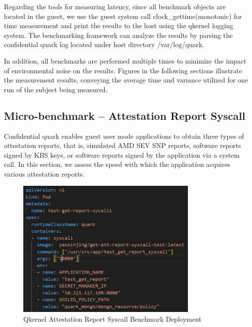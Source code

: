 Regarding the tools for measuring latency, since all benchmark objects are located in the guest, we use the guest system call clock\_gettime(monotonic) \cite*{clock_gettime} for time measurement and print the results to the host using the qkernel logging system. The benchmarking framework \cite*{benchamark_framework} can analyze the 
results by parsing the confidential quark log located under host directory /var/log/quark.

In addition, all benchmarks are performed multiple times to minimize the impact of environmental noise on the results. Figures in the following sections illustrate the measurement results, conveying the average time and variance utilized for one run of the subject being measured.

\subsection{Micro-benchmark – Attestation Report Syscall}\label{Attestation_Report_Syscall}

Confidential quark enables guest user mode applications to obtain three types of attestation reports, that is, simulated AMD SEV SNP reports, software reports signed by KBS keys, or software reports signed by the application via a system call. In this section, we assess 
the speed with which the application acquires various attestation reports.

\begin{figure}[H]
    \centering
    \includegraphics[width=0.8\textwidth]{images/perf_attestation_report_yaml.PNG}
    \caption[Qkernel Attestation Report Syscall Benchmark Deployment]{Qkernel Attestation Report Syscall Benchmark Deployment}
    \label{fig:perf_attestation_report_yaml}
\end{figure}

